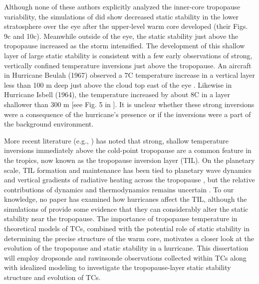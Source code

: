 Although none of these authors explicitly analyzed the inner-core tropopause variability, the simulations of \cite{OhnoSatoh2015} did show decreased static stability in the lower stratosphere over the eye after the upper-level warm core developed (their Figs. 9c and 10c).
Meanwhile outside of the eye, the static stability just above the tropopause increased as the storm intensified.
The development of this shallow layer of large static stability is consistent with a few early observations of strong, vertically confined temperature inversions just above the tropopause.
An aircraft in Hurricane Beulah (1967) observed a 7\textdegree{}C temperature increase in a vertical layer less than 100 m deep just above the cloud top east of the eye \citep{Waco1970}.
Likewise in Hurricane Isbell (1964), the temperature increased by about 8\textdegree{}C in a layer shallower than 300 m [see Fig. 5 in \cite{Gentry1967}].
It is unclear whether these strong inversions were a consequence of the hurricane’s presence or if the inversions were a part of the background environment.

More recent literature (e.g., \cite{Wirth2003}) has noted that strong, shallow temperature inversions immediately above the cold-point tropopause are a common feature in the tropics, now known as the tropopause inversion layer (TIL).
On the planetary scale, TIL formation and maintenance has been tied to planetary wave dynamics \cite{Griseetal2010} and vertical gradients of radiative heating across the tropopause \citep{Randeletal2007}, but the relative contributions of dynamics and thermodynamics remains uncertain \citep{Ferreiraetal2016}.
To our knowledge, no paper has examined how hurricanes affect the TIL, although the simulations of \cite{OhnoSatoh2015} provide some evidence that they can considerably alter the static stability near the tropopause.
The importance of tropopause temperature in theoretical models of TCs, combined with the potential role of static stability in determining the precise structure of the warm core, motivates a closer look at the evolution of the tropopause and static stability in a hurricane.
This dissertation will employ dropsonde and rawinsonde observations collected within TCs along with idealized modeling to investigate the tropopause-layer static stability structure and evolution of TCs.

\clearpage


